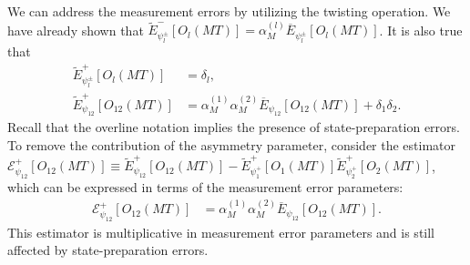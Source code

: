 \documentclass[%
 reprint,
superscriptaddress,
 amsmath,amssymb,
 aps,
pra,
]{revtex4-2}
\begin{document}
We can address the measurement errors by utilizing the twisting operation. We have already shown that $\tilde{E}^-_{\psi^\pm_{l}}[O_l(MT)]=\alpha_M^{(l)}\overline{E}_{\psi_l^\pm}[O_l(MT)]$. It is also true that
\begin{align}
    \tilde{E}^+_{\psi^\pm_{l}}[O_l(MT)]&=\delta_l,\\
    \tilde{E}^+_{\psi_{12}}[O_{12}(MT)]&=\alpha_M^{(1)}\alpha_M^{(2)}\overline{E}_{\psi_{12}}[O_{12}(MT)]+\delta_1\delta_2.
\end{align}
Recall that the overline notation implies the presence of state-preparation errors. To remove the contribution of the asymmetry parameter, consider the estimator $\mathcal{E}^+_{\psi_{12}}[O_{12}(MT)]\equiv\tilde{E}^+_{\psi_{12}}[O_{12}(MT)]-\tilde{E}^+_{\psi^+_{1}}[O_1(MT)]\tilde{E}^+_{\psi^+_{2}}[O_2(MT)]$, which can be expressed in terms of the measurement error parameters:
\begin{align}
    \mathcal{E}^+_{\psi_{12}}[O_{12}(MT)]&=\alpha_M^{(1)}\alpha_M^{(2)}\overline{E}_{\psi_{12}}[O_{12}(MT)].
\end{align}
This estimator is multiplicative in measurement error parameters and is still affected by state-preparation errors.
\end{document}

